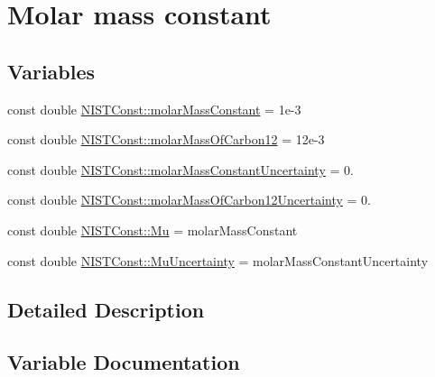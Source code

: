 \hypertarget{group___n_i_s_t_const-_molar_mass_constant}{}\section{Molar mass constant}
\label{group___n_i_s_t_const-_molar_mass_constant}
\subsection*{Variables}
\begin{DoxyCompactItemize}
\item 
const double \hyperlink{group___n_i_s_t_const-_molar_mass_constant_ga83c1719df0cda1b4eae15de014b8f857}{N\+I\+S\+T\+Const\+::molar\+Mass\+Constant} = 1e-\/3
\item 
const double \hyperlink{group___n_i_s_t_const-_molar_mass_constant_gab1aae3b38f21cb9a15fdc8209d3cf1f0}{N\+I\+S\+T\+Const\+::molar\+Mass\+Of\+Carbon12} = 12e-\/3
\item 
const double \hyperlink{group___n_i_s_t_const-_molar_mass_constant_ga7aea373fd7ef8740aa22140aab339ce8}{N\+I\+S\+T\+Const\+::molar\+Mass\+Constant\+Uncertainty} = 0.
\item 
const double \hyperlink{group___n_i_s_t_const-_molar_mass_constant_gae2fea17985c3e8877e1baab9f9382676}{N\+I\+S\+T\+Const\+::molar\+Mass\+Of\+Carbon12\+Uncertainty} = 0.
\item 
const double \hyperlink{group___n_i_s_t_const-_molar_mass_constant_ga06104635bf45affb9e10a3f6581b4076}{N\+I\+S\+T\+Const\+::\+Mu} = molar\+Mass\+Constant
\item 
const double \hyperlink{group___n_i_s_t_const-_molar_mass_constant_gacb7d27c9a39a3add815f0c8b97d5b425}{N\+I\+S\+T\+Const\+::\+Mu\+Uncertainty} = molar\+Mass\+Constant\+Uncertainty
\end{DoxyCompactItemize}


\subsection{Detailed Description}


\subsection{Variable Documentation}
\mbox{\label{group___n_i_s_t_const-_molar_mass_constant_ga83c1719df0cda1b4eae15de014b8f857}} 
